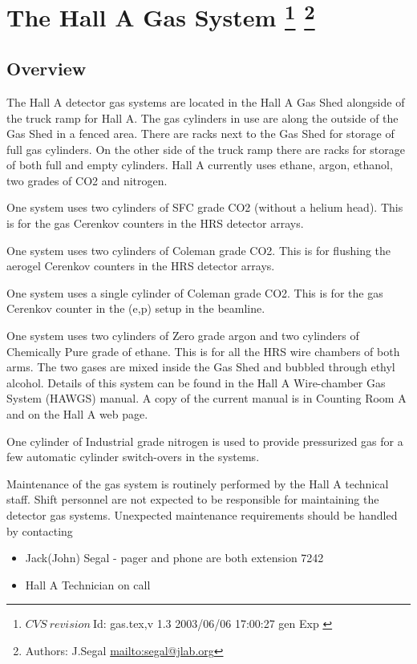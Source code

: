\section[The Hall A Gas System]{The Hall A Gas System
\footnote{
  $CVS~revision~ $Id: gas.tex,v 1.3 2003/06/06 17:00:27 gen Exp $ $
}
\footnote{Authors: J.Segal \url{mailto:segal@jlab.org}}
}

\subsection{Overview}
The Hall A detector gas systems are located in the Hall A Gas Shed
alongside of the truck ramp for Hall A.  The gas cylinders in use
are along the outside of the Gas Shed in a fenced area.
There are racks next to
the Gas Shed for storage of full gas cylinders.  On the other side of the
truck ramp there are racks for storage of both full and empty cylinders.
Hall A currently uses ethane, argon, ethanol, two grades of CO2
and nitrogen.

One system uses two cylinders of SFC grade CO2 (without a helium head).
This is for the gas Cerenkov counters in the HRS detector arrays.

One system uses two cylinders of Coleman grade CO2.  This is for
flushing the aerogel Cerenkov counters in the HRS detector arrays.

One system uses a single cylinder of Coleman grade CO2.  This is for
the gas Cerenkov counter in the (e,p) setup in the beamline.

One system uses two cylinders of Zero grade argon and two cylinders
of Chemically Pure grade of ethane.  This is for all the HRS wire chambers
of both arms.  The two gases are mixed inside the Gas Shed and bubbled
through ethyl alcohol.  Details of this system can be found in the
Hall A Wire-chamber Gas System (HAWGS) manual.  A copy of the current
manual is in Counting Room A and on the Hall A web page.

One cylinder of Industrial grade nitrogen is used to provide pressurized
gas for a few automatic cylinder switch-overs in the systems.

Maintenance of the gas system is routinely performed by the Hall A
technical staff.  Shift personnel are not expected to be responsible
for maintaining the detector gas systems.  Unexpected maintenance
requirements should be handled by contacting

\begin{itemize} 
\item[~]Jack(John) Segal - pager and phone are both extension 7242
\item[~]Hall A Technician on call
\end{itemize} 

